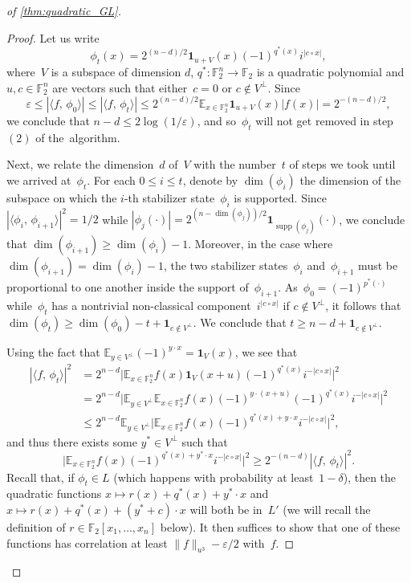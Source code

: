 \documentclass[10pt,a4paper]{amsart}
\newcommand{\E}{\mathbb{E}}
\newcommand{\F}{\mathbb{F}} %
\newcommand{\eps}{\varepsilon}
\newcommand{\one}{\mathbf{1}}
\DeclareMathOperator{\supp}{supp}
\begin{document}
\begin{proof}[ of \cref{thm:quadratic_GL}]
\begin{proof}
Let us write
$$\phi_t(x) = 2^{(n-d)/2} \one_{u+V}(x) (-1)^{q^*(x)} i^{|c\circ x|},$$
where~$V$ is a subspace of dimension $d$, $q^*: \F_2^n \to \F_2$ is a quadratic polynomial and $u, c \in \F_2^n$ are vectors such that either~$c=0$ or $c\notin V^{\perp}$.
Since
$$\eps \leq |\langle f,\, \phi_0 \rangle| \leq |\langle f,\, \phi_t \rangle| \leq 2^{(n-d)/2} \E_{x\in \F_2^n} \one_{u+V}(x) |f(x)| = 2^{-(n-d)/2},$$
we conclude that $n-d \leq 2\log(1/\eps)$, and so~$\phi_t$ will not get removed in step~$(2)$ of the~algorithm.

Next, we relate the dimension~$d$ of~$V$ with the number~$t$ of steps we took until we arrived at~$\phi_t$.
For each $0\leq i\leq t$, denote by $\dim(\phi_i)$ the dimension of the subspace on which the $i$-th stabilizer state~$\phi_i$ is supported.
Since $|\langle\phi_i,\, \phi_{i+1}\rangle|^2 = 1/2$ while $|\phi_j(\cdot)| = 2^{(n-\dim(\phi_j))/2} \one_{\supp(\phi_j)}(\cdot)$, we conclude that
$\dim(\phi_{i+1}) \geq \dim(\phi_i)-1$.
Moreover, in the case where $\dim(\phi_{i+1}) = \dim(\phi_i)-1$, the two stabilizer states~$\phi_i$ and~$\phi_{i+1}$ must be proportional to one another inside the support of~$\phi_{i+1}$.
As~$\phi_0 = (-1)^{p^*(\cdot)}$ while~$\phi_t$ has a nontrivial non-classical component~$i^{|c\circ x|}$ if $c\notin V^{\perp}$, it follows that $\dim(\phi_t) \geq \dim(\phi_0) - t + \one_{c\notin V^{\perp}}$.
We conclude that $t \geq n-d + \one_{c\notin V^{\perp}}$.

Using the fact that $\E_{y\in V^{\perp}} (-1)^{y\cdot x} = \one_V(x)$, we see that
\begin{align*}
    |\langle f,\, \phi_t \rangle|^2
    &= 2^{n-d} \big|\E_{x\in \F_2^n} f(x) \one_{V}(x+u) (-1)^{q^*(x)} i^{-|c\circ x|}\big|^2 \\
    &= 2^{n-d} \big|\E_{y\in V^{\perp}} \E_{x\in \F_2^n} f(x) (-1)^{y\cdot (x+u)} (-1)^{q^*(x)} i^{-|c\circ x|}\big|^2 \\
    &\leq 2^{n-d} \E_{y\in V^{\perp}} \big|\E_{x\in \F_2^n} f(x) (-1)^{q^*(x) + y\cdot x} i^{-|c\circ x|}\big|^2,
\end{align*}
and thus there exists some $y^* \in V^{\perp}$ such that
\begin{equation} \label{eq:ystar}
    \big|\E_{x\in \F_2^n} f(x) (-1)^{q^*(x) + y^* \cdot x} i^{-|c\circ x|}\big|^2 \geq 2^{-(n-d)} |\langle f,\, \phi_t \rangle|^2.
\end{equation}
Recall that, if $\phi_t \in L$ (which happens with probability at least~$1-\delta$), then the quadratic functions $x\mapsto r(x) + q^*(x) + y^*\cdot x$ and $x\mapsto r(x) + q^*(x) + (y^*+c)\cdot x$ will both be in~$L'$
(we will recall the definition of $r\in \F_2[x_1, \dots, x_n]$ below).
It then suffices to show that one of these functions has correlation at least $\|f\|_{u^3}-\eps/2$ with~$f$.


\end{proof}
\end{proof}
\end{document}
